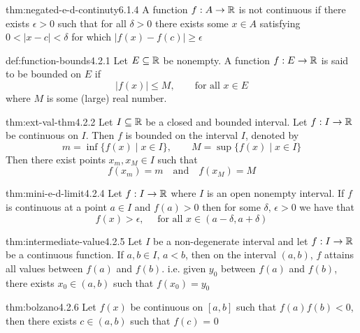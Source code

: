\documentclass[landscape, 8pt]{extarticle}
\begin{document}
\begin{multicols}{3}
\begin{thm}{thm:negated-e-d-continuty}{6.1.4}
    A function $f:A\to\mathbb{R}$ is not continuous if there exists $\epsilon>0$ such that for all $\delta>0$ there exists some $x \in A$ satisfying $0<\lvert x-c \rvert<\delta$ for which $\lvert  f(x)-f(c) \rvert\ge \epsilon$
\end{thm}
\vspace{-5pt}

\begin{dfn}{def:function-bounds}{4.2.1}
Let $E\subseteq\mathbb{R}$ be nonempty. A function $f:E\to \mathbb{R}$ is said to be bounded on $E$ if
\[\lvert f(x)\rvert \le M,\qquad \text{for all } x\in E\]
where $M$ is some (large) real number.
\end{dfn}
\vspace{-5pt}

\begin{thm}{thm:ext-val-thm}{4.2.2}
Let $I\subseteq \mathbb{R}$ be a closed and bounded interval. Let $f:I\to \mathbb{R}$ be continuous on $I$. Then $f$ is bounded on the interval $I$, denoted by
\[m = \inf\{f(x)\mid x\in I\},\qquad M = \sup\{f(x)\mid x\in I\}\]
Then there exist points $x_{m}, x_{M}\in I$ such that
\[f(x_{m}) = m \quad \text{and} \quad f(x_{M}) = M\]
\end{thm}
\vspace{-5pt}

\begin{thm}{thm:mini-e-d-limit}{4.2.4}
Let $f: I\to \mathbb{R}$ where $I$ is an open nonempty interval. If $f$ is continuous at a point $a\in I$ and $f(a)> 0$ then for some $\delta,\,\epsilon> 0$ we have that
\[f(x)>\epsilon,\quad \text{ for all } x\in (a-\delta, a+\delta)\]
\end{thm}
\vspace{-5pt}

\begin{thm}{thm:intermediate-value}{4.2.5}
Let $I$ be a non-degenerate interval and let $f:I\to\mathbb{R}$ be a continuous function. If $a,b\in I,\,a<b$, then on the interval $(a,b)$, $f$ attains all values between $f(a)$ and $f(b)$. i.e. given $y_{0}$ between $f(a)$ and $f(b)$, there exists $x_{0}\in(a,b)$ such that $f(x_{0}) = y_{0}$
\end{thm}
\vspace{-5pt}

\begin{thm}{thm:bolzano}{4.2.6}
Let $f(x)$ be continuous on $[a,b]$ such that $f(a)f(b) < 0$, then there exists $c\in (a,b)$ such that $f(c)$ = 0
\end{thm}
\vspace{-5pt}


\end{multicols}
\end{document}
